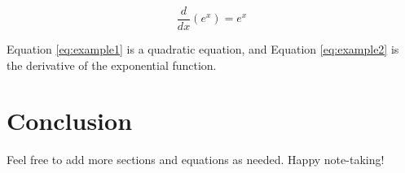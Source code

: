 \documentclass{article}
\begin{document}
\begin{equation}
    \label{eq:example2}
    \frac{d}{dx} \left( e^x \right) = e^x
\end{equation}

Equation \ref{eq:example1} is a quadratic equation, and Equation \ref{eq:example2} is the derivative of the exponential function.

\section{Conclusion}

Feel free to add more sections and equations as needed. Happy note-taking!
\end{document}
